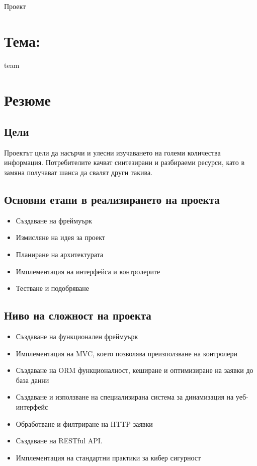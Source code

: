 \documentclass[12pt]{article}
\begin{document}


\begin{center}
    {\huge Проект \appId{}}
\end{center}

\section{Тема: \appTitle{}}
{team}

\section{Резюме}
\subsection{Цели}
Проектът цели да насърчи и улесни изучаването на
големи количества информация. Потребителите качват
синтезирани и разбираеми ресурси, като в замяна
получават шанса да свалят други такива.

\subsection{Основни етапи в реализирането на проекта}
\begin{itemize}
    \item Създаване на фреймуърк
    \item Измисляне на идея за проект
    \item Планиране на архитектурата
    \item Имплементация на интерфейса и контролерите
    \item Тестване и подобряване
\end{itemize}

\subsection{Ниво на сложност на проекта}
\begin{itemize}
    \item Създаване на функционален фреймуърк
    \item Имплементация на MVC, което позволява
        преизползване на контролери
    \item Създаване на ORM функционалност, кеширане
        и оптимизиране на заявки до база данни
    \item Създаване и използване на специализирана
        система за динамизация на уеб-интерфейс
    \item Обработване и филтриране на HTTP заявки
    \item Създаване на RESTful API.
    \item Имплементация на стандартни практики
        за кибер сигурност
\end{itemize}
\end{document}
